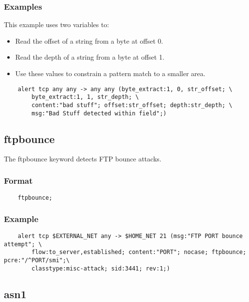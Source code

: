 \documentclass[english]{report}
\begin{document}
\subsubsection{Examples}

This example uses two variables to:
\begin{itemize}
\item Read the offset of a string from a byte at offset 0.
\item Read the depth of a string from a byte at offset 1.
\item Use these values to constrain a pattern match to a smaller area.
\end{itemize}

\begin{verbatim}
    alert tcp any any -> any any (byte_extract:1, 0, str_offset; \
        byte_extract:1, 1, str_depth; \
        content:"bad stuff"; offset:str_offset; depth:str_depth; \
        msg:"Bad Stuff detected within field";)
\end{verbatim}

\subsection{ftpbounce}

The ftpbounce keyword detects FTP bounce attacks.

\subsubsection{Format}
                                                                                
\begin{verbatim}
    ftpbounce;
\end{verbatim}

\subsubsection{Example}

\begin{verbatim}
    alert tcp $EXTERNAL_NET any -> $HOME_NET 21 (msg:"FTP PORT bounce attempt"; \
        flow:to_server,established; content:"PORT"; nocase; ftpbounce; pcre:"/^PORT/smi";\
        classtype:misc-attack; sid:3441; rev:1;)
\end{verbatim}

\subsection{asn1}
\label{asn1}
\end{document}
